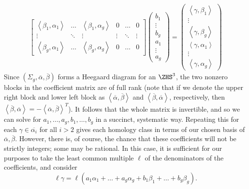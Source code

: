 \begin{enumerate}
\begin{align*}
\begin{bmatrix}
			\left< \beta_1, \alpha_1 \right> & \dots & \left< \beta_1, \alpha_g \right> & 0 & \dots & 0\\
			\vdots & \ddots & \vdots & \vdots & \ddots & \vdots\\
			\left< \beta_g, \alpha_1 \right> & \dots & \left< \beta_g, \alpha_g \right> & 0 & \dots & 0
			\end{bmatrix} \begin{pmatrix} b_1\\ \vdots \\ b_g \\ a_1 \\ \vdots \\ a_g \end{pmatrix} = \begin{pmatrix} \left< \gamma, \beta_1 \right> \\ \vdots \\ \left< \gamma, \beta_g \right> \\ \left< \gamma, \alpha_1 \right> \\ \vdots \\ \left< \gamma, \alpha_g \right> \end{pmatrix} 
	\end{align*}
	Since $(\Sigma_g, \overline{\alpha}, \overline{\beta})$ forms a Heegaard diagram for an $\ZHS^3$, the two nonzero blocks in the coefficient matrix are of full rank (note that if we denote the upper right block and lower left block as $\left< \overline{\alpha}, \overline{\beta} \right>$ and $\left< \overline{\beta}, \overline{\alpha} \right>$, respectively, then $\left< \overline{\beta}, \overline{\alpha} \right> = -\left< \overline{\alpha}, \overline{\beta} \right>^T$). It follows that the whole matrix is invertible, and so we can solve for $a_1,\dots,a_g,b_1,\dots,b_g$ in a succinct, systematic way. Repeating this for each $\gamma \in \overline{\alpha_i}$ for all $i > 2$ gives each homology class in terms of our chosen basis of $\overline{\alpha}, \overline{\beta}$. However, there is, of course, the chance that these coefficients will not be strictly integers; some may be rational. In this case, it is sufficient for our purposes to take the least common multiple $\ell$ of the denominators of the coefficients, and consider \[\ell \gamma = \ell(a_1\alpha_1 + \dots + a_g\alpha_g + b_1\beta_1 + \dots + b_g\beta_g).\] 


\end{enumerate}
